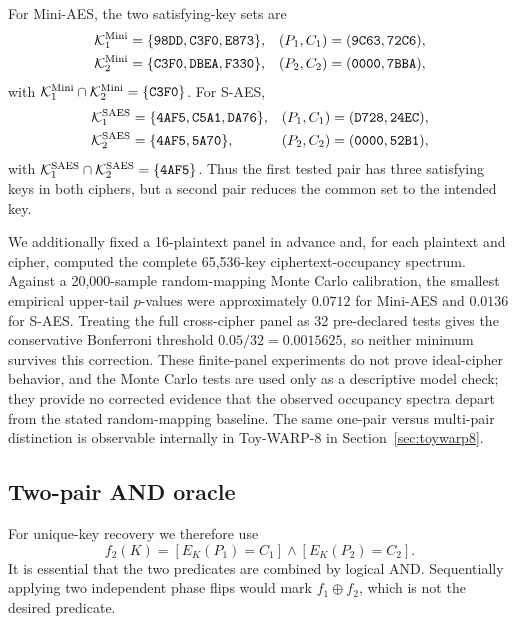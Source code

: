 \documentclass[pdflatex,sn-nature]{sn-jnl}
\theoremstyle{thmstyleone}
\theoremstyle{thmstyletwo}
\begin{document}
For Mini-AES, the two satisfying-key sets are
\begin{align}
\mathcal{K}^{\rm Mini}_1
&=\{\mathtt{98DD},\mathtt{C3F0},\mathtt{E873}\},
& (P_1,C_1)&=(\mathtt{9C63},\mathtt{72C6}),\\
\mathcal{K}^{\rm Mini}_2
&=\{\mathtt{C3F0},\mathtt{DBEA},\mathtt{F330}\},
& (P_2,C_2)&=(\mathtt{0000},\mathtt{7BBA}),
\end{align}
with $\mathcal{K}^{\rm Mini}_1\cap\mathcal{K}^{\rm Mini}_2=\{\mathtt{C3F0}\}$.  For S-AES,
\begin{align}
\mathcal{K}^{\rm SAES}_1
&=\{\mathtt{4AF5},\mathtt{C5A1},\mathtt{DA76}\},
& (P_1,C_1)&=(\mathtt{D728},\mathtt{24EC}),\\
\mathcal{K}^{\rm SAES}_2
&=\{\mathtt{4AF5},\mathtt{5A70}\},
& (P_2,C_2)&=(\mathtt{0000},\mathtt{52B1}),
\end{align}
with $\mathcal{K}^{\rm SAES}_1\cap\mathcal{K}^{\rm SAES}_2=\{\mathtt{4AF5}\}$.  Thus the first tested pair has three satisfying keys in both ciphers, but a second pair reduces the common set to the intended key.

We additionally fixed a 16-plaintext panel in advance and, for each plaintext and cipher, computed the complete 65,536-key ciphertext-occupancy spectrum. Against a 20,000-sample random-mapping Monte Carlo calibration, the smallest empirical upper-tail $p$-values were approximately $0.0712$ for Mini-AES and $0.0136$ for S-AES. Treating the full cross-cipher panel as 32 pre-declared tests gives the conservative Bonferroni threshold $0.05/32=0.0015625$, so neither minimum survives this correction. These finite-panel experiments do not prove ideal-cipher behavior, and the Monte Carlo tests are used only as a descriptive model check; they provide no corrected evidence that the observed occupancy spectra depart from the stated random-mapping baseline. The same one-pair versus multi-pair distinction is observable internally in Toy-WARP-8 in Section~\ref{sec:toywarp8}.

\subsection{Two-pair AND oracle}
For unique-key recovery we therefore use
\begin{equation}
    f_2(K)=[E_K(P_1)=C_1]\land[E_K(P_2)=C_2].
    \label{eq:two_pair_pred}
\end{equation}
It is essential that the two predicates are combined by logical AND. Sequentially applying two independent phase flips would mark $f_1\oplus f_2$, which is not the desired predicate.
\end{document}
